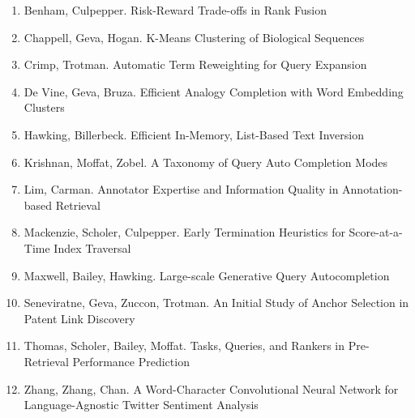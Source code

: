 \documentclass[a4paper]{article}
\begin{document}
\begin{enumerate}
\item Benham, Culpepper. Risk-Reward Trade-offs in Rank Fusion
\item Chappell, Geva, Hogan. K-Means Clustering of Biological Sequences
\item Crimp, Trotman. Automatic Term Reweighting for Query Expansion
\item De Vine, Geva, Bruza. Efficient Analogy Completion with Word Embedding Clusters
\item Hawking, Billerbeck. Efficient In-Memory, List-Based Text Inversion
\item Krishnan, Moffat, Zobel. A Taxonomy of Query Auto Completion Modes
\item Lim, Carman. Annotator Expertise and Information Quality in Annotation-based Retrieval
\item Mackenzie, Scholer, Culpepper. Early Termination Heuristics for Score-at-a-Time Index Traversal
\item Maxwell, Bailey, Hawking. Large-scale Generative Query Autocompletion
\item Seneviratne, Geva, Zuccon, Trotman. An Initial Study of Anchor Selection in Patent Link Discovery
\item Thomas, Scholer, Bailey, Moffat. Tasks, Queries, and Rankers in Pre-Retrieval Performance Prediction
\item Zhang, Zhang, Chan. A Word-Character Convolutional Neural Network for Language-Agnostic Twitter Sentiment Analysis
\end{enumerate}
\end{document}
